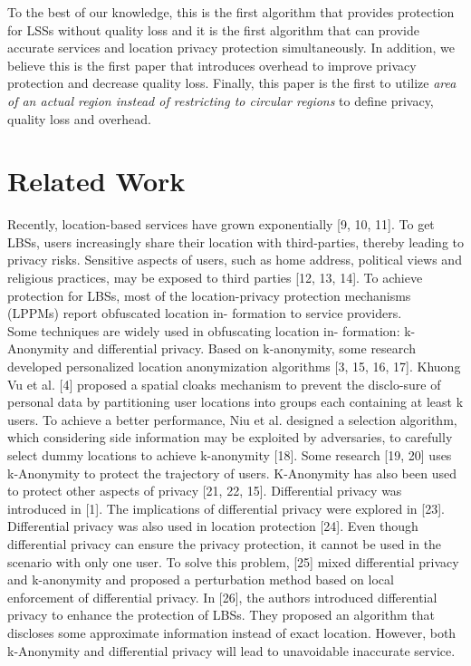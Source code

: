 \documentclass[a4paper,fleqn]{cas-dc}
\begin{document}
To the best of our knowledge, this is the first algorithm that provides protection for LSSs without quality loss and it is the first algorithm that can provide accurate services and location privacy protection simultaneously. In addition, we believe this is the first paper that introduces overhead to improve privacy protection and decrease quality loss. Finally, this paper is the first to utilize \textit{ area of an actual region instead of restricting to circular regions} to define privacy, quality loss and overhead.

\section{Related Work}
Recently, location-based services have grown exponentially [9, 10, 11]. To get LBSs, users increasingly share their location with third-parties, thereby leading to privacy risks. Sensitive aspects of users, such as home address, political views and religious practices, may be exposed to third parties [12, 13, 14]. To achieve protection for LBSs, most of the location-privacy protection mechanisms (LPPMs) report obfuscated location in- formation to service providers.\\

Some techniques are widely used in obfuscating location in- formation: k-Anonymity and differential privacy. Based on k-anonymity, some research developed personalized location anonymization algorithms [3, 15, 16, 17]. Khuong Vu et al.
[4] proposed a spatial cloaks mechanism to prevent the disclo-sure of personal data by partitioning user locations into groups each containing at least k users. To achieve a better performance, Niu et al. designed a selection algorithm, which considering side information may be exploited by adversaries, to carefully select dummy locations to achieve k-anonymity [18]. Some research [19, 20] uses k-Anonymity to protect the trajectory of users. K-Anonymity has also been used to protect other aspects of privacy [21, 22, 15]. Differential privacy was introduced in [1]. The implications of differential privacy were explored in [23]. Differential privacy was also used in location protection [24]. Even though differential privacy can ensure the privacy protection, it cannot be used in the scenario with only one user. To solve this problem, [25] mixed differential privacy and k-anonymity and proposed a perturbation method based on local enforcement of differential privacy. In [26], the authors introduced differential privacy to enhance the protection of LBSs. They proposed an algorithm that discloses some approximate information instead of exact location. However, both
k-Anonymity and differential privacy will lead to unavoidable inaccurate service.
\end{document}
